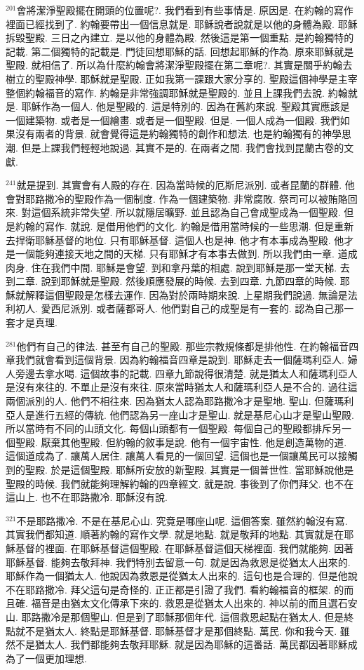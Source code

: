 \documentclass{book}
\begin{document}
$^{201}$會將潔淨聖殿擺在開頭的位置呢?.
我們看到有些事情是.
原因是.
在約翰的寫作裡面已經找到了.
約翰要帶出一個信息就是.
耶穌說者說就是以他的身體為殿.
耶穌拆毀聖殿.
三日之內建立.
是以他的身體為殿.
然後這是第一個重點.
是約翰獨特的記載.
第二個獨特的記載是.
門徒回想耶穌的話.
回想起耶穌的作為.
原來耶穌就是聖殿.
就相信了.
所以為什麼約翰會將潔淨聖殿擺在第二章呢?.
其實是關乎約翰去樹立的聖殿神學.
耶穌就是聖殿.
正如我第一課跟大家分享的.
聖殿這個神學是主宰整個約翰福音的寫作.
約翰是非常強調耶穌就是聖殿的.
並且上課我們去說.
約翰就是.
耶穌作為一個人.
他是聖殿的.
這是特別的.
因為在舊約來說.
聖殿其實應該是一個建築物.
或者是一個繪畫.
或者是一個聖殿.
但是.
一個人成為一個殿.
我們如果沒有兩者的背景.
就會覺得這是約翰獨特的創作和想法.
也是約翰獨有的神學思潮.
但是上課我們輕輕地說過.
其實不是的.
在兩者之間.
我們會找到昆蘭古卷的文獻.

$^{241}$就是提到.
其實會有人殿的存在.
因為當時候的厄斯尼派別.
或者昆蘭的群體.
他會對耶路撒冷的聖殿作為一個制度.
作為一個建築物.
非常腐敗.
祭司可以被賄賂回來.
對這個系統非常失望.
所以就隱居曠野.
並且認為自己會成聖成為一個聖殿.
但是約翰的寫作.
就說.
是借用他們的文化.
約翰是借用當時候的一些思潮.
但是重新去捍衛耶穌基督的地位.
只有耶穌基督.
這個人也是神.
他才有本事成為聖殿.
他才是一個能夠連接天地之間的天梯.
只有耶穌才有本事去做到.
所以我們由一章.
道成肉身.
住在我們中間.
耶穌是會望.
到和拿丹葉的相處.
說到耶穌是那一堂天梯.
去到二章.
說到耶穌就是聖殿.
然後順應發展的時候.
去到四章.
九節四章的時候.
耶穌就解釋這個聖殿是怎樣去運作.
因為對於兩時期來說.
上星期我們說過.
無論是法利初人.
愛西尼派別.
或者薩都哥人.
他們對自己的成聖是有一套的.
認為自己那一套才是真理.

$^{281}$他們有自己的律法.
甚至有自己的聖殿.
那些宗教規條都是排他性.
在約翰福音四章我們就會看到這個背景.
因為約翰福音四章是說到.
耶穌走去一個薩瑪利亞人.
婦人旁邊去拿水喝.
這個故事的記載.
四章九節說得很清楚.
就是猶太人和薩瑪利亞人是沒有來往的.
不單止是沒有來往.
原來當時猶太人和薩瑪利亞人是不合的.
過往這兩個派別的人.
他們不相往來.
因為猶太人認為耶路撒冷才是聖地.
聖山.
但薩瑪利亞人是進行五經的傳統.
他們認為另一座山才是聖山.
就是基尼心山才是聖山聖殿.
所以當時有不同的山頭文化.
每個山頭都有一個聖殿.
每個自己的聖殿都排斥另一個聖殿.
厭棄其他聖殿.
但約翰的敘事是說.
他有一個宇宙性.
他是創造萬物的道.
這個道成為了.
讓萬人居住.
讓萬人看見的一個回望.
這個也是一個讓萬民可以接觸到的聖殿.
於是這個聖殿.
耶穌所安放的新聖殿.
其實是一個普世性.
當耶穌說他是聖殿的時候.
我們就能夠理解約翰的四章經文.
就是說.
事後到了你們拜父.
也不在這山上.
也不在耶路撒冷.
耶穌沒有說.

$^{321}$不是耶路撒冷.
不是在基尼心山.
究竟是哪座山呢.
這個答案.
雖然約翰沒有寫.
其實我們都知道.
順著約翰的寫作文學.
就是地點.
就是敬拜的地點.
其實就是在耶穌基督的裡面.
在耶穌基督這個聖殿.
在耶穌基督這個天梯裡面.
我們就能夠.
因著耶穌基督.
能夠去敬拜神.
我們特別去留意一句.
就是因為救恩是從猶太人出來的.
耶穌作為一個猶太人.
他說因為救恩是從猶太人出來的.
這句也是合理的.
但是他說不在耶路撒冷.
拜父這句是奇怪的.
正正都是引證了我們.
看約翰福音的框架.
的而且確.
福音是由猶太文化傳承下來的.
救恩是從猶太人出來的.
神以前的而且選石安山.
耶路撒冷是那個聖山.
但是到了耶穌那個年代.
這個救恩起點在猶太人.
但是終點就不是猶太人.
終點是耶穌基督.
耶穌基督才是那個終點.
萬民.
你和我今天.
雖然不是猶太人.
我們都能夠去敬拜耶穌.
就是因為耶穌的這番話.
萬民都因著耶穌成為了一個更加理想.
\end{document}
